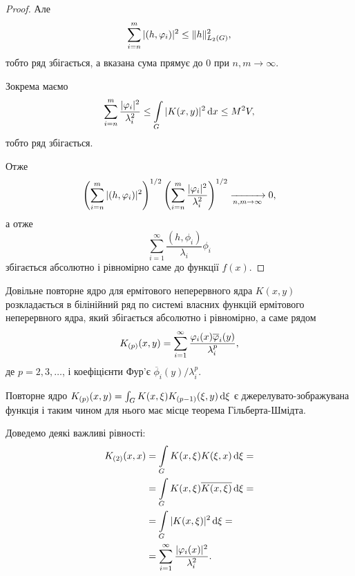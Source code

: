 \begin{proof}
    Але
    \begin{equation}
        \displaystyle\sum\limits_{i=n}^m |(h, \varphi_i)|^2 \le \|h\|_{L_2(G)}^2,
    \end{equation}
    тобто ряд збігається, а вказана сума прямує до 0 при $n, m \to \infty$.

    Зокрема маємо
    \begin{equation}
        \displaystyle\sum\limits_{i=n}^m \dfrac{|\varphi_i|^2}{\lambda_i^2} \le \displaystyle\int\limits_G |K(x, y)|^2 \mathop{}\!\mathrm{d} x \le M^2 V, 
    \end{equation}
    тобто ряд збігається. \medskip

    Отже
    \begin{equation}
        \left(\displaystyle\sum\limits_{i=n}^m |(h, \varphi_i)|^2\right)^{1/2} \left(\displaystyle\sum\limits_{i=n}^m \dfrac{|\varphi_i|^2}{\lambda_i^2}\right)^{1/2} \xrightarrow[n, m \to \infty]{} 0,
    \end{equation}
    а отже
    \begin{equation}
        \sum_{i=1}^\infty \frac{(h, \phi_i)}{\lambda_i} \phi_i
    \end{equation}
    збігається абсолютно і рівномірно саме до функції $f(x)$.
\end{proof}

\begin{corollary}
    \label{corollary:2.4.10}
    Довільне повторне ядро для ермітового неперервного ядра $K(x ,y)$ розкладається в білінійний ряд по системі власних функцій ермітового неперервного ядра, який збігається абсолютно і рівномірно, а саме рядом
    \begin{equation}
        K_{(p)}(x, y) = \displaystyle\sum\limits_{i = 1}^\infty \dfrac{\varphi_i(x) \overline {\varphi}_i(y)}{\lambda_i^p},
    \end{equation}
    де $p = 2, 3, \ldots$, і коефіцієнти Фур'є  $\overline \phi_i(y) / \lambda_i^p$.
\end{corollary}

Повторне ядро $K_{(p)}(x,y) = \int_G K(x, \xi) K_{(p - 1)} (\xi, y) \mathop{}\!\mathrm{d} \xi$ є джерелувато-зображувана функція і таким чином для нього має місце теорема Гільберта-Шмідта. \medskip

Доведемо деякі важливі рівності:
\begin{equation}
    \begin{aligned}
    K_{(2)} (x, x) &= \displaystyle\int\limits_G K(x, \xi) K(\xi, x) \mathop{}\!\mathrm{d} \xi = \\
    &= \displaystyle\int\limits_G K(x, \xi) \overline {K(x, \xi)} \mathop{}\!\mathrm{d} \xi = \\
    &= \displaystyle\int\limits_G |K(x, \xi)|^2 \mathop{}\!\mathrm{d} \xi = \\
    &= \displaystyle\sum\limits_{i = 1}^\infty \dfrac{|\varphi_i(x)|^2}{\lambda_i^2}.
    \end{aligned}
\end{equation}

